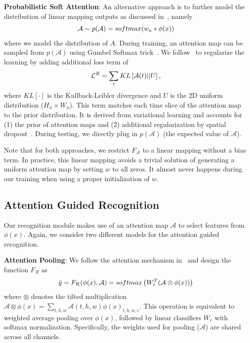 \documentclass[10pt,twocolumn,letterpaper]{article}
\begin{document}
\noindent \textbf{Probabilistic Soft Attention}: An alternative approach is to further model the distribution of linear mapping outputs as discussed in~\cite{Li_2018_ECCV}, namely 
\begin{equation}
\small
    \mathcal{A} \sim p(\mathcal{A}) = softmax(w_a * \phi(x))
\end{equation}
where we model the distribution of $A$. During training, an attention map can be sampled from $p(\mathcal{A})$ using Gumbel Softmax trick~\cite{jang2016categorical, maddison2016concrete}. We follow~\cite{Li_2018_ECCV} to regularize the learning by adding additional loss term of 
\begin{equation}
\label{eq:reg_atten}
\small
    \mathcal{L}^R = \sum_t KL\left[\mathcal{A}(t) || U\right], 
\end{equation}
where $KL[\cdot]$ is the Kullback-Leibler divergence and $U$ is the 2D uniform distribution ($H_\phi \times W_\phi$). This term matches each time slice of the attention map to the prior distribution. It is derived from variational learning and accounts for (1) the prior of attention maps and (2) additional regularization by spatial dropout~\cite{Li_2018_ECCV}. During testing, we directly plug in $p(\mathcal{A})$ (the expected value of $\mathcal{A}$).

Note that for both approaches, we restrict $F_{\mathcal{A}}$ to a linear mapping without a bias term. In practice, this linear mapping avoids a trivial solution of generating a uniform attention map by setting $w$ to all zeros. It almost never happens during our training when using a proper initialization of $w$.

\subsection{Attention Guided Recognition}
Our recognition module makes use of an attention map $\mathcal{A}$ to select features from $\phi(x)$. Again, we consider two different models for the attention guided recognition. 

\noindent \textbf{Attention Pooling}: We follow the attention mechanism in~\cite{wang2017residual,liu2018end} and design the function $F_{\mathcal{R}}$ as 
\begin{equation}
\label{eq:direct_atten}
\small
    \Tilde{y} = F_{\mathcal{R}}(\phi(x), \mathcal{A}) = softmax\left( W_r^T (\mathcal{A} \otimes \phi(x)) \right)
\end{equation}
where $\otimes$ denotes the tilted multiplication $\mathcal{A} \otimes \phi(x) = \sum_{t,h,w} \mathcal{A}(t, h, w) \phi(x)_{t,h,w,c}$. This operation is equivalent to weighted average pooling over $\phi(x)$, followed by linear classifiers $W_r$ with softmax normalization. Specifically, the weights used for pooling ($\mathcal{A}$) are shared across all channels.
 
\end{document}
